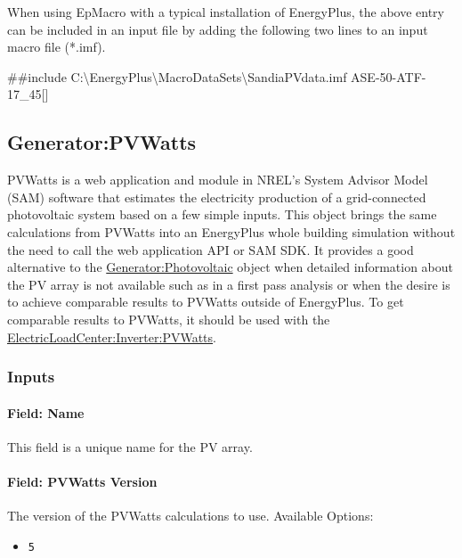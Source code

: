 When using EpMacro with a typical installation of EnergyPlus, the above entry can be included in an input file by adding the following two lines to an input macro file (*.imf).

\#\#include C:\textbackslash{}EnergyPlus\textbackslash{}MacroDataSets\textbackslash{}SandiaPVdata.imf ASE-50-ATF-17\_45{[]}

\subsection{Generator:PVWatts}\label{generatorpvwatts}

PVWatts is a web application and module in NREL's System Advisor Model (SAM) software that estimates the electricity production of a grid-connected photovoltaic system based on a few simple inputs. This object brings the same calculations from PVWatts into an EnergyPlus whole building simulation without the need to call the web application API or SAM SDK. It provides a good alternative to the \hyperref[generatorphotovoltaic-000]{Generator:Photovoltaic} object when detailed information about the PV array is not available such as in a first pass analysis or when the desire is to achieve comparable results to PVWatts outside of EnergyPlus. To get comparable results to PVWatts, it should be used with the \hyperref[electricloadcenterinverterpvwatts]{ElectricLoadCenter:Inverter:PVWatts}.

\subsubsection{Inputs}\label{input-description}

\paragraph{Field: Name}\label{generatorpvwatts-field-name}

This field is a unique name for the PV array.

\paragraph{Field: PVWatts Version}\label{field-pvwatts-version}

The version of the PVWatts calculations to use. Available Options:

\begin{itemize}
\tightlist
\item
  \texttt{5}
\end{itemize}

